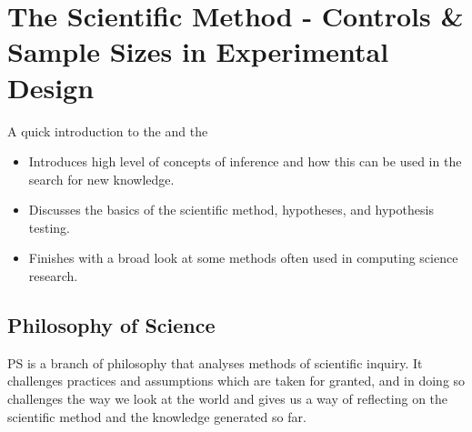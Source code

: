 \section{The Scientific Method - Controls \& Sample Sizes in Experimental Design}

    \par{A quick introduction to the  and the  }

 	\begin{itemize}
 		\item Introduces high level of concepts of inference and how this can be used in the search for new knowledge.
 		\item Discusses the basics of the scientific method, hypotheses, and hypothesis testing. 
 		\item Finishes with a broad look at some methods often used in computing science research.
 	\end{itemize}

 	\subsection{Philosophy of Science}

 		\par{PS is a branch of philosophy that analyses methods of scientific inquiry. It challenges practices and assumptions which are taken for granted, and in doing so challenges the way we look at the world and gives us a way of reflecting on the scientific method and the knowledge generated so far.}

